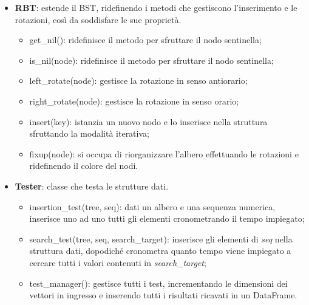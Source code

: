\documentclass{article}
\begin{document}
\begin{itemize}
\begin{itemize}
        \item get\_height(node): restituisce l'altezza di un nodo;
        \item update\_height(node): aggiorna l'altezza di un nodo calcolandola sfruttando quella dei suoi figli;
        \item left\_rotate(node): gestisce la rotazione in senso antiorario. Il nodo passato rappresenta il perno su cui verrà eseguita la rotazione;
        \item right\_rotate(node): gestisce la rotazione in senso orario;
        \item fixup(node): è chiamato dal metodo \textit{insert()} e si occupa di aggiornare le altezze dei nodi dopo che ne è stato aggiunto uno nuovo.
        \item insert(key): metodo pubblico che istanzia un nuovo nodo e gestisce l'inserimento;
    \end{itemize}
    \item \textbf{RBT}: estende il BST, ridefinendo i metodi che gestiscono l'inserimento e le rotazioni, così da soddisfare le sue proprietà.
    \begin{itemize}
        \item get\_nil(): ridefinisce il metodo per sfruttare il nodo sentinella;
        \item is\_nil(node): ridefinisce il metodo per sfruttare il nodo sentinella;
        \item left\_rotate(node): gestisce la rotazione in senso antiorario;
        \item right\_rotate(node): gestisce la rotazione in senso orario;
        \item insert(key): istanzia un nuovo nodo e lo inserisce nella struttura sfruttando la modalità iterativa;
        \item fixup(node): si occupa di riorganizzare l'albero effettuando le rotazioni e ridefinendo il colore del nodi.
    \end{itemize}
    \item \textbf{Tester}: classe che testa le strutture dati.
    \begin{itemize}
        \item insertion\_test(tree, seq): dati un albero e una sequenza numerica, inserisce uno ad uno tutti gli elementi cronometrando il tempo impiegato;
        \item search\_test(tree, seq, search\_target): inserisce gli elementi di \textit{seq} nella struttura dati, dopodiché cronometra quanto tempo viene impiegato a cercare tutti i valori contenuti in \textit{search\_target};
        \item test\_manager(): gestisce tutti i test, incrementando le dimensioni dei vettori in ingresso e inserendo tutti i risultati ricavati in un DataFrame.
    \end{itemize}
\end{itemize}
\end{document}
